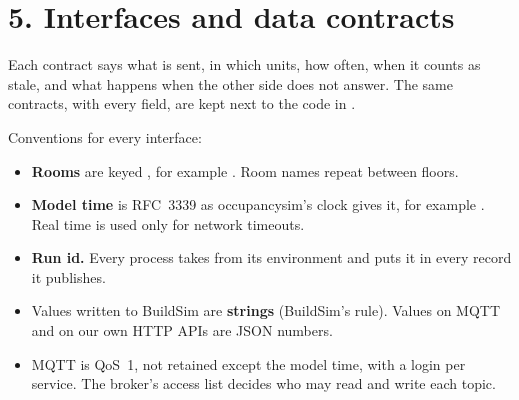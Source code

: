 \section{5. Interfaces and data contracts}

\sloppy

Each contract says what is sent, in which units, how often, when it counts as
stale, and what happens when the other side does not answer. The same
contracts, with every field, are kept next to the code in
.

Conventions for every interface:
\begin{itemize}
\tightlist
\item \textbf{Rooms} are keyed , for example
  . Room names repeat between floors.
\item \textbf{Model time} is RFC~3339 as occupancysim's clock gives it, for
  example . Real time is used only for network
  timeouts.
\item \textbf{Run id.} Every process takes  from its environment
  and puts it in every record it publishes.
\item Values written to BuildSim are \textbf{strings} (BuildSim's rule). Values
  on MQTT and on our own HTTP APIs are JSON numbers.
\item MQTT is QoS~1, not retained except the model time, with a login per
  service. The broker's access list decides who may read and write each topic.
\end{itemize}

